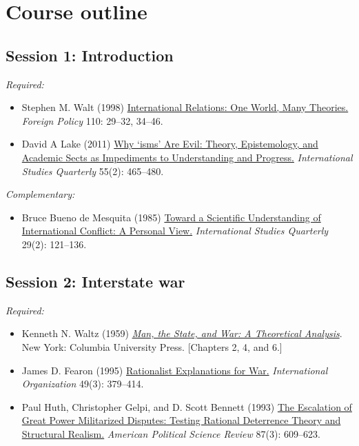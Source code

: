 \documentclass[12pt, a4paper]{article}
\begin{document}
\newpage
\section{Course outline}


\subsection*{Session 1: Introduction}

\noindent\textit{Required:}

\begin{itemize}
  \item Stephen M. Walt (1998) \href{https://doi.org/10.2307/1149275}{International Relations: One World, Many Theories.} \textit{Foreign Policy} 110: 29--32, 34--46.
  \item David A Lake (2011) \href{https://doi.org/10.1111/j.1468-2478.2011.00661.x}{Why `isms' Are Evil: Theory, Epistemology, and Academic Sects as Impediments to Understanding and Progress.} \textit{International Studies Quarterly} 55(2): 465--480.
\end{itemize}

\noindent\textit{Complementary:}

\begin{itemize}
  \item Bruce Bueno de Mesquita (1985) \href{https://doi.org/10.2307/2600500}{Toward a Scientific Understanding of International Conflict: A Personal View.} \textit{International Studies Quarterly} 29(2): 121--136.
\end{itemize}


\vspace{20pt}
\hline
\subsection*{Session 2: Interstate war}

\noindent\textit{Required:}

\begin{itemize}
  \item Kenneth N. Waltz (1959) \href{https://cup.columbia.edu/book/man-the-state-and-war/9780231188043}{\textit{Man, the State, and War: A Theoretical Analysis}}. New York: Columbia University Press. [Chapters 2, 4, and 6.]
  \item James D. Fearon (1995) \href{https://doi.org/10.1017/S0020818300033324}{Rationalist Explanations for War.} \textit{International Organization} 49(3): 379--414.
  \item Paul Huth, Christopher Gelpi, and D. Scott Bennett (1993) \href{https://doi.org/10.2307/2938739}{The Escalation of Great Power Militarized Disputes: Testing Rational Deterrence Theory and Structural Realism.} \textit{American Political Science Review} 87(3): 609--623.
\end{itemize}
\end{document}
